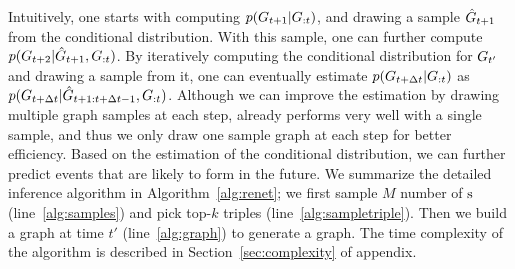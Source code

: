 Intuitively, one starts with computing {\small $p(G_{t+1}|G_{:t})$}, and drawing a sample $\hat{G}_{t+1}$ from the conditional distribution. With this sample, one can further compute {\small $p(G_{t+2}|\hat{G}_{t+1},G_{:t})$}. By iteratively computing the conditional distribution for $G_{t'}$ and drawing a sample from it, one can eventually estimate {\small $p (G_{t+\Delta t}|G_{:t})$} as {\small $p(G_{t+\Delta t}|\hat{G}_{t+1:t+\Delta t-1},G_{:t})$}. 
Although we can improve the estimation by drawing multiple graph samples at each step, \method already performs very well with a single sample, and thus we only draw one sample graph at each step for better efficiency. 
Based on the estimation of the conditional distribution, we can further predict events that are likely to form in the future. 
We summarize the detailed inference algorithm in Algorithm~\ref{alg:renet}; we first sample $M$ number of $\mathrm{s}$ (line~\ref{alg:samples}) and pick top-$k$ triples (line~\ref{alg:sampletriple}). Then we build a graph at time $t'$ (line~\ref{alg:graph}) to generate a graph. The time complexity of the algorithm is described in Section~\ref{sec:complexity} of appendix.




